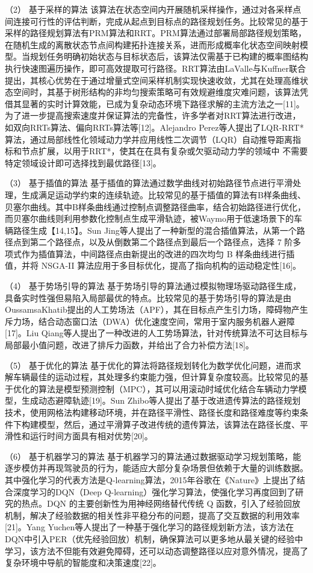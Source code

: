 \documentclass[lettersize,journal]{IEEEtran}
\begin{document}
（2）	基于采样的算法
该算法在状态空间内开展随机采样操作，通过对各采样点间连接可行性的评估判断，完成从起点到目标点的路径规划任务。比较常见的基于采样的路径规划算法有PRM算法和RRT。PRM算法通过部署局部路径规划策略，在随机生成的离散状态节点间构建拓扑连接关系，进而形成概率化状态空间映射模型。当规划任务明确初始状态与目标状态后，该算法仅需基于已构建的概率图结构执行快速图遍历操作，即可高效提取可行路径。RRT算法由LaValle与Kuffner联合提出，其核心优势在于通过增量式空间采样机制实现快速收敛，尤其在处理高维状态空间时，其基于树形结构的非均匀搜索策略可有效规避维度灾难问题，该算法凭借其显著的实时计算效能，已成为复杂动态环境下路径求解的主流方法之一[11]。为了进一步提高搜索速度并保证算法的完备性，许多学者对RRT算法进行改进，如双向RRTs算法、偏向RRTs算法等[12]。Alejandro Perez等人提出了LQR-RRT*算法，通过局部线性化领域动力学并应用线性二次调节（LQR）自动推导距离指标和节点扩展，以用于RRT*，使其在在具有复杂或欠驱动动力学的领域中 不需要特定领域设计即可选择找到最优路径[13]。

（3）	基于插值的算法
基于插值的算法通过数学曲线对初始路径节点进行平滑处理，生成满足运动学约束的连续轨迹。比较常见的基于插值的算法有B样条曲线、贝塞尔曲线。其中B样条曲线通过控制点调整路径曲率，结合初始路径进行优化，而贝塞尔曲线则利用参数化控制点生成平滑轨迹，被Waymo用于低速场景下的车辆路径生成【14,15】。Sun Jing等人提出了一种新型的混合插值算法，从第一个路径点到第二个路径点，以及从倒数第二个路径点到最后一个路径点，选择 7 阶多项式作为插值算法，中间路径点由新提出的改进的四次均匀 B 样条曲线进行插值，并将 NSGA-II 算法应用于多目标优化，提高了指向机构的运动稳定性[16]。

（4）	基于势场引导的算法
基于势场引导的算法通过模拟物理场驱动路径生成，具备实时性强但易陷入局部最优的特点。比较常见的基于势场引导的算法是由OussamsaKhatib提出的人工势场法（APF），其在目标点产生引力场，障碍物产生斥力场，结合动态窗口法（DWA）优化速度空间，常用于室内服务机器人避障[17]。Liu Qiang等人提出了一种改进的人工势场算法，针对传统算法不可达目标与局部最小值问题，改进了排斥力函数，并给出了合力补偿方法[18]。

（5）	基于优化的算法
基于优化的算法将路径规划转化为数学优化问题，进而求解车辆最佳的运动过程，其处理多约束能力强，但计算复杂度较高。比较常见的基于优化的算法是模型预测控制（MPC），其可以用滚动时域优化结合车辆动力学模型，生成动态避障轨迹[19]。Sun Zhibo等人提出了基于改进遗传算法的路径规划技术，使用网格法构建移动环境，并在路径平滑性、路径长度和路径难度等约束条件下构建模型，然后，通过平滑算子改进传统的遗传算法，该算法在路径长度、平滑性和运行时间方面具有相对优势[20]。

（6）	基于机器学习的算法
基于机器学习的算法通过数据驱动学习规划策略，能逐步模仿并再现驾驶员的行为，能适应大部分复杂场景但依赖于大量的训练数据。其中强化学习的代表方法是Q-learning算法，2015年谷歌在《Nature》上提出了结合深度学习的DQN（Deep Q-learning）强化学习算法，使强化学习再度回到了研究的热点。DQN 的主要创新性为用神经网络替代传统 Q 函数，引入了经验回放机制，解决了经验数据的相关性非平稳分布的问题，提高了交互数据的利用效率[21]。Yang Yuchen等人提出了一种基于强化学习的路径规划新方法，该方法在DQN中引入PER（优先经验回放）机制，确保算法可以更多地从最关键的经验中学习，该方法不但能有效避免障碍，还可以动态调整路径以应对意外情况，提高了复杂环境中导航的智能度和决策速度[22]。
\end{document}

